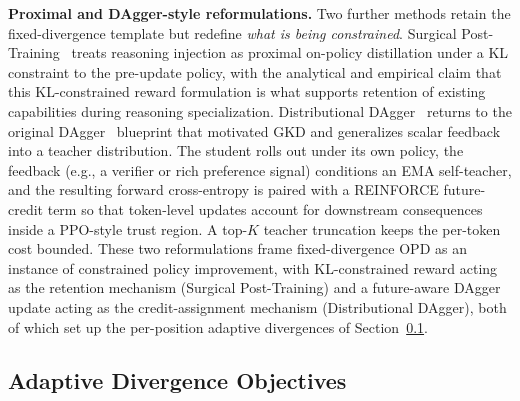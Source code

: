 \documentclass{article} %
\begin{document}
\textbf{Proximal and DAgger-style reformulations.} Two further methods retain the fixed-divergence template but redefine \emph{what is being constrained}. Surgical Post-Training~\citep{2603.01683} treats reasoning injection as proximal on-policy distillation under a KL constraint to the pre-update policy, with the analytical and empirical claim that this KL-constrained reward formulation is what supports retention of existing capabilities during reasoning specialization. Distributional DAgger~\citep{2606.05152} returns to the original DAgger~\citep{1011.0686} blueprint that motivated GKD and generalizes scalar feedback into a teacher distribution. The student rolls out under its own policy, the feedback (e.g., a verifier or rich preference signal) conditions an EMA self-teacher, and the resulting forward cross-entropy is paired with a REINFORCE future-credit term so that token-level updates account for downstream consequences inside a PPO-style trust region. A top-$K$ teacher truncation keeps the per-token cost bounded. These two reformulations frame fixed-divergence OPD as an instance of constrained policy improvement, with KL-constrained reward acting as the retention mechanism (Surgical Post-Training) and a future-aware DAgger update acting as the credit-assignment mechanism (Distributional DAgger), both of which set up the per-position adaptive divergences of Section~\ref{subsec:adaptive_div}.

\subsection{Adaptive Divergence Objectives}
\label{subsec:adaptive_div}
\end{document}
